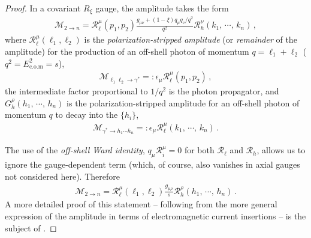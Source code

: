 
\begin{proof}
   In a covariant \(R_\xi\) gauge, the amplitude takes the form
   \begin{align}
       \mathcal{M}_{2 \to n}
       =
       \mathcal{R}_\ell^\mu(p_1, p_2)
       \frac{g_{\mu\nu} + (1-\xi) q_\mu q_\nu/q^2}{q^2}
       \mathcal{R}_h^\nu(k_1,\,\cdots,\,k_n)
       \,,
   \end{align}
where \(\mathcal{R}_\ell^\mu(\ell_1,\ell_2)\) is the \textit{polarization-stripped amplitude} (or \textit{remainder} of the amplitude) for the production of an off-shell photon of momentum \(q = \ell_1 + \ell_2\) (\(q^2 = E_\text{c.o.m}^2 = s\)),
   \begin{align}
       \mathcal{M}_{\ell_1\ell_2 \to \gamma^*}
       =:
       \epsilon_\mu \mathcal{R}_\ell^\mu(p_1, p_2)
       \,,
   \end{align}
   the intermediate factor proportional to \(1/q^2\) is the photon propagator, and \(G_h^\rho(h_1,\,\cdots,\,h_n)\) is the polarization-stripped amplitude for an off-shell photon of momentum \(q\) to decay into the \(\{h_i\}\),
   \begin{align}
       \mathcal{M}_{\gamma^* \to h_1\cdots h_n}
       =:
       \epsilon_\mu \mathcal{R}_\ell^\mu(k_1,\,\cdots,\, k_n)
       \,.
   \end{align}

   The use of the \textit{off-shell Ward identity}, \(q_\mu \mathcal{R}_i^\mu = 0\) for both \(\mathcal{R}_\ell\) and \(\mathcal{R}_h\), allows us to ignore the gauge-dependent term (which, of course, also vanishes in axial gauges not considered here).
   Therefore
   \begin{align}
       \mathcal{M}_{2 \to n}
       =
       \mathcal{R}_\ell^\mu(\ell_1, \ell_2)
       \frac{g_{\mu\rho}}{s}
       \mathcal{R}_h^\rho(h_1,\,\cdots,\,h_n)
       \,.
   \end{align}
   A more detailed proof of this statement -- following from the more general expression of the amplitude in terms of electromagnetic current insertions -- is the subject of .


\end{proof}
